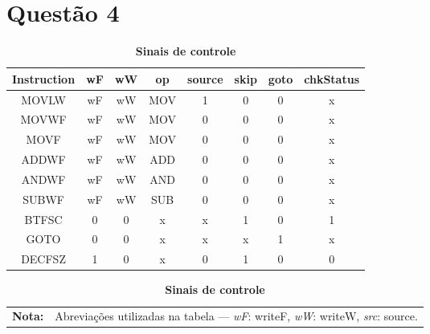 \documentclass[12pt]{report}
\begin{document}
	\section*{Questão 4}
		\begin{table}[ht]
			\centering
			\caption{\textbf{Sinais de controle}}
			\begin{tabular}{cccccccc}
				\toprule
				\textbf{Instruction} & \textbf{wF} & \textbf{wW} & \textbf{op} & \textbf{source} & \textbf{skip} & \textbf{goto} & \textbf{chkStatus} \\
				\midrule
				MOVLW & wF & wW & MOV & 1 & 0 & 0 & x \\
				MOVWF & wF & wW & MOV & 0 & 0 & 0 & x \\
				MOVF & wF & wW & MOV & 0 & 0 & 0 & x \\
				ADDWF & wF & wW & ADD & 0 & 0 & 0 & x \\
				ANDWF & wF & wW & AND & 0 & 0 & 0 & x \\
				SUBWF & wF & wW & SUB & 0 & 0 & 0 & x \\
				BTFSC & 0 & 0 & x & x & 1 & 0 & 1 \\
				GOTO & 0 & 0 & x & x & x & 1 & x \\
				DECFSZ & 1 & 0 & x & 0 & 1 & 0 & 0 \\
				\bottomrule
			\end{tabular}\label{tab:Sinais de controle}
			\begin{tabularx}{\textwidth}{l X}
				\textbf{Nota:} & Abreviações utilizadas na tabela --- \textit{wF}: writeF, \textit{wW}: writeW, \textit{src}: source.
			\end{tabularx}
		\end{table}
\end{document}
